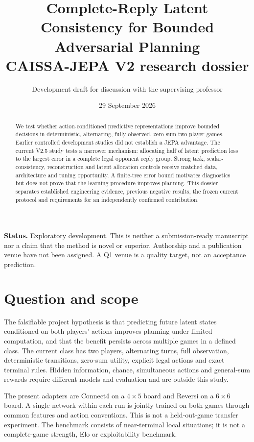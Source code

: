 \documentclass[11pt,a4paper]{article}
\title{Complete-Reply Latent Consistency for Bounded Adversarial Planning\\
\large CAISSA-JEPA V2 research dossier}
\author{Development draft for discussion with the supervising professor}
\date{29 September 2026}
\begin{document}
\maketitle
\begin{abstract}
We test whether action-conditioned predictive representations improve bounded
decisions in deterministic, alternating, fully observed, zero-sum two-player
games. Earlier controlled development studies did not establish a JEPA
advantage. The current V2.5 study tests a narrower mechanism: allocating half
of latent prediction loss to the largest error in a complete legal opponent
reply group. Strong task, scalar-consistency, reconstruction and latent
allocation controls receive matched data, architecture and tuning opportunity.
A finite-tree error bound motivates diagnostics but does not prove that the
learning procedure improves planning. This dossier separates established
engineering evidence, previous negative results, the frozen current protocol
and requirements for an independently confirmed contribution.
\end{abstract}

\textbf{Status.} Exploratory development. This is neither a submission-ready
manuscript nor a claim that the method is novel or superior. Authorship and a
publication venue have not been assigned. A Q1 venue is a quality target, not
an acceptance prediction.

\section{Question and scope}
The falsifiable project hypothesis is that predicting future latent states
conditioned on both players' actions improves planning under limited computation,
and that the benefit persists across multiple games in a defined class.
The current class has two players, alternating turns, full observation,
deterministic transitions, zero-sum utility, explicit legal actions and exact
terminal rules. Hidden information, chance, simultaneous actions and general-sum
rewards require different models and evaluation and are outside this study.

The present adapters are Connect4 on a $4\times5$ board and Reversi on a
$6\times6$ board. A single network within each run is jointly trained on both
games through common features and action conventions. This is not a held-out-game
transfer experiment. The benchmark consists of near-terminal local situations;
it is not a complete-game strength, Elo or exploitability benchmark.
\end{document}

